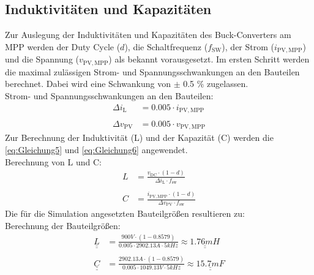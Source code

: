 \subsection{Induktivitäten und Kapazitäten}
\label{sec:Induktivitaten_und_Kapazitaeten}
Zur Auslegung der Induktivitäten und Kapazitäten des Buck-Converters am MPP werden der Duty Cycle ($d$), die Schaltfrequenz ($f_{\mathrm{SW}}$), der Strom ($i_{\mathrm{PV,MPP}}$) und die Spannung ($v_{\mathrm{PV,MPP}}$) als bekannt vorausgesetzt. Im ersten Schritt werden die maximal zulässigen Strom- und Spannungsschwankungen an den Bauteilen berechnet. Dabei wird eine Schwankung von $\pm$ 0.5 $\%$ zugelassen.\\
Strom- und Spannungsschwankungen an den Bauteilen:
\begin{align*}
    \Delta i_{\mathrm{L}} &= 0.005 \cdot i_{\mathrm{PV,MPP}} \\\\
    \Delta v_{\mathrm{PV}} &= 0.005 \cdot v_{\mathrm{PV,MPP}}
\end{align*}
\newline
Zur Berechnung der Induktivität (L) und der Kapazität (C) werden die \autoref{eq:Gleichung5} und \autoref{eq:Gleichung6} angewendet.\\
\newline
Berechnung von L und C:
\begin{align}
    L &= \frac{v_{\mathrm{DC}}\cdot(1-d)}{\Delta i_{\mathrm{L}}\cdot f_{\mathrm{sw}}} \label{eq:Gleichung5}\\ \nonumber \\
    C &= \frac{i_{\mathrm{PV,MPP}}\cdot(1-d)}{\Delta v_{\mathrm{PV}}\cdot f_{\mathrm{sw}}} \label{eq:Gleichung6}
\end{align}
\newline
Die für die Simulation angesetzten Bauteilgrößen resultieren zu:\\
\newline
Berechnung der Bauteilgrößen:
\begin{align}
     \underline{\underline{L}} &= \frac{900V\cdot(1-0.8579)}{0.005\cdot 2902.13A\cdot 5kHz} \approx \underline{\underline{1.76mH}} \label{eq:Gleichung7} \\ \nonumber \\
     \underline{\underline{C}} &= \frac{2902.13A\cdot (1-0.8579)}{0.005\cdot 1049.13V\cdot 5kHz} \approx \underline{\underline{15.7mF}} \label{eq:Gleichung8}
\end{align}
